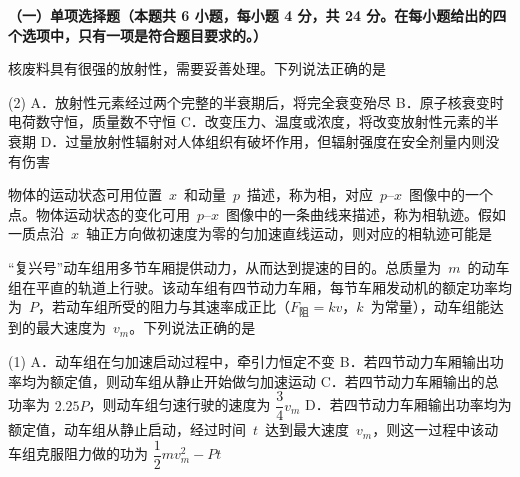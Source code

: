 

\textbf{（一）单项选择题（本题共 6 小题，每小题 4 分，共 24 分。在每小题给出的四个选项中，只有一项是符合题目要求的。）}

\begin{question}
核废料具有很强的放射性，需要妥善处理。下列说法正确的是\gkblank

\begin{gkopts}(2)
  \task A．放射性元素经过两个完整的半衰期后，将完全衰变殆尽
  \task B．原子核衰变时电荷数守恒，质量数不守恒
  \task C．改变压力、温度或浓度，将改变放射性元素的半衰期
  \task D．过量放射性辐射对人体组织有破坏作用，但辐射强度在安全剂量内则没有伤害
\end{gkopts}
\end{question}

\begin{question}
物体的运动状态可用位置~$x$~和动量~$p$~描述，称为相，对应~$p$--$x$~图像中的一个点。物体运动状态的变化可用~$p$--$x$~图像中的一条曲线来描述，称为相轨迹。假如一质点沿~$x$~轴正方向做初速度为零的匀加速直线运动，则对应的相轨迹可能是\gkblank

\end{question}

\begin{question}
``复兴号''动车组用多节车厢提供动力，从而达到提速的目的。总质量为~$m$~的动车组在平直的轨道上行驶。该动车组有四节动力车厢，每节车厢发动机的额定功率均为~$P$，若动车组所受的阻力与其速率成正比（$F_{\text{阻}}=kv$，$k$~为常量），动车组能达到的最大速度为~$v_{m}$。下列说法正确的是\gkblank

\begin{gkopts}(1)
  \task A．动车组在匀加速启动过程中，牵引力恒定不变
  \task B．若四节动力车厢输出功率均为额定值，则动车组从静止开始做匀加速运动
  \task C．若四节动力车厢输出的总功率为 $2.25P$，则动车组匀速行驶的速度为 $\dfrac{3}{4}v_{m}$
  \task D．若四节动力车厢输出功率均为额定值，动车组从静止启动，经过时间~$t$~达到最大速度~$v_{m}$，则这一过程中该动车组克服阻力做的功为 $\dfrac{1}{2}mv_{m}^{2}-Pt$
\end{gkopts}
\end{question}

